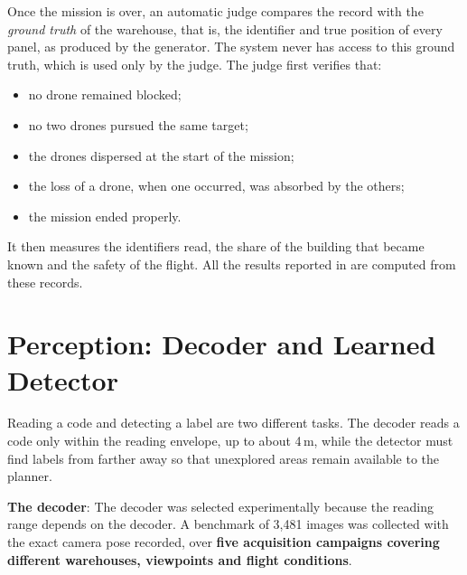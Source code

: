 Once the mission is over, an automatic judge compares the record with the
\emph{ground truth} of the warehouse, that is, the identifier and true position of
every  panel, as produced by the generator. The system never
has access to this ground truth, which is used only by the judge. The judge first
verifies that:

\begin{itemize}[itemsep=0.2em]
    \item no drone remained blocked;
    \item no two drones pursued the same target;
    \item the drones dispersed at the start of the mission;
    \item the loss of a drone, when one occurred, was absorbed by the others;
    \item the mission ended properly.
\end{itemize}

It then measures the identifiers read, the share of the building that became
known and the safety of the flight. All the results reported in  are
computed from these records.

\section{Perception: Decoder and Learned Detector}%
\label{sec:impl:perception}

Reading a code and detecting a label are two different tasks. The decoder reads a
 code only within the reading envelope, up to about 4\,m,
while the detector must find labels from farther away so that unexplored areas
remain available to the planner.

\textbf{The decoder}: The decoder was selected experimentally because the reading
range depends on the decoder. A benchmark of 3,481 images was collected with the
exact camera pose recorded, over \textbf{five acquisition campaigns covering
    different warehouses, viewpoints and flight conditions}.

